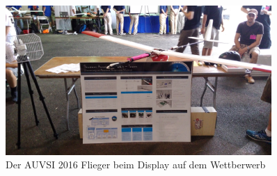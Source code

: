 \begin{figure}[H]
\centering
\includegraphics[width=0.9\textwidth]{bilder/Fotos/AUVSI_2016_Display.jpg} 
\caption{Der AUVSI 2016 Flieger beim Display auf dem Wettberwerb} 
\label{Der AUVSI 2016 Flieger beim Display auf dem Wettberwerb}
\end{figure}